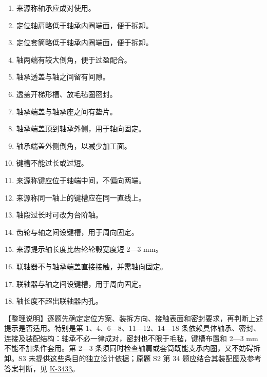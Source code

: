 \documentclass[zihao=5,a4paper,UTF8,fontset=fandol]{ctexart}
\begin{document}
\begin{enumerate}
\item 
来源称轴承应成对使用。


\item 
定位轴肩略低于轴承内圈端面，便于拆卸。


\item 
定位套筒略低于轴承内圈端面，便于拆卸。


\item 
轴两端有较大倒角，便于过盈配合。


\item 
轴承透盖与轴之间留有间隙。


\item 
透盖开梯形槽、放毛毡圈密封。


\item 
轴承端盖与轴承座之间有垫片。


\item 
轴承端盖顶到轴承外侧，用于轴向固定。


\item 
轴承端盖外侧倒角，以减少加工面。


\item 
键槽不能过长或过短。


\item 
来源称键应位于轴端中间，不偏向两端。


\item 
来源称同一轴上的键槽应在同一直线上。


\item 
轴段过长时可改为台阶轴。


\item 
齿轮与轴之间设键槽，用于周向固定。


\item 
来源提示轴长度比齿轮轮毂宽度短 2—3 mm。


\item 
联轴器不与轴承端盖直接接触，并需轴向固定。


\item 
联轴器与轴之间设键槽，用于周向固定。


\item 
轴长度不超出联轴器内孔。



\end{enumerate}

【整理说明】逐题先确定定位方案、装拆方向、接触表面和密封要求，再判断上述提示是否适用。特别是第 1、4、6—8、11—12、14—18 条依赖具体轴承、密封、连接及装配结构：轴承不必一律成对，密封也不限于毛毡，键槽布置和 2—3 mm 不能不加条件套用。第 2—3 条须同时检查轴肩或套筒既能支承内圈，又不妨碍拆卸。S3 未提供这些条目的独立设计依据；原题 S2 第 34 题应结合其装配图及参考答案判断，见 \hyperref[k-3433]{K-3433}。
\end{document}
